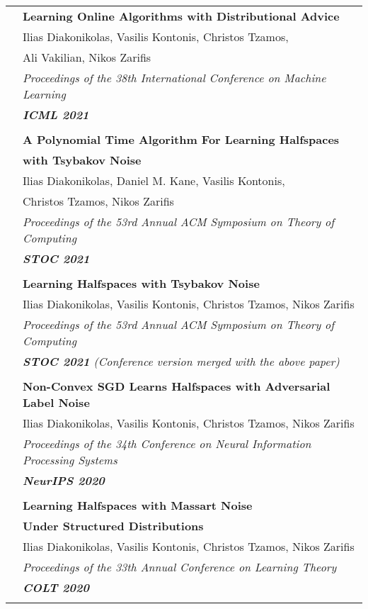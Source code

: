 \documentclass[letterpaper,11pt,oneside]{article}
\begin{document}
\begin{longtable}{@{} l l}
     &\textbf{Learning Online Algorithms with Distributional Advice}\\
     & Ilias Diakonikolas, Vasilis Kontonis, Christos Tzamos,\\
     & Ali Vakilian, Nikos Zarifis \\
     & \emph{Proceedings of the 38th International Conference on Machine Learning} \\
     & \emph{\textbf{ICML 2021}} \\
     & \\

     &\textbf{A Polynomial Time Algorithm For Learning Halfspaces}\\
     & \textbf{with Tsybakov Noise}\\
     & Ilias Diakonikolas, Daniel M. Kane, Vasilis Kontonis,\\
     & Christos Tzamos, Nikos Zarifis \\
     & \emph{Proceedings of the 53rd Annual ACM Symposium on Theory of Computing}\\
     & \emph{\textbf{STOC 2021}} \\
     & \\

     &\textbf{Learning Halfspaces with Tsybakov Noise}\\
     & Ilias Diakonikolas, Vasilis Kontonis, Christos Tzamos, Nikos Zarifis \\
     & \emph{Proceedings of the 53rd Annual ACM Symposium on Theory of Computing} \\
     & \emph{\textbf{STOC 2021} 
     (Conference version merged with the above paper)
     } \\
     & \\



     &\textbf{Non-Convex SGD Learns Halfspaces with Adversarial Label Noise} \\
     & Ilias Diakonikolas, Vasilis Kontonis, Christos Tzamos, Nikos Zarifis \\
     & \emph{Proceedings of the 34th Conference on Neural Information Processing Systems} \\
     & \emph{\textbf{NeurIPS 2020}} \\
     & \\

     &\textbf{Learning Halfspaces with Massart Noise}\\
     &\textbf{Under Structured Distributions}\\
     & Ilias Diakonikolas, Vasilis Kontonis, Christos Tzamos, Nikos Zarifis \\
     & \emph{Proceedings of the 33th Annual Conference on Learning Theory} \\
     & \emph{\textbf{COLT 2020}} \\
     & \\


\end{longtable}
\end{document}
